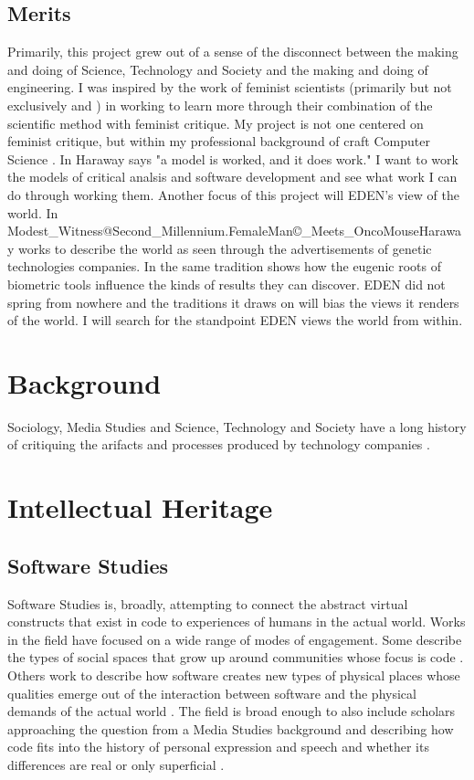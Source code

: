 \documentclass[a4paper,man,natbib]{apa6}
\begin{document}
   \subsection*{Merits}
   Primarily, this project grew out of a sense of the disconnect between the making and doing of Science, Technology and Society and the making and doing of engineering. I was inspired by the work of feminist scientists (primarily but not exclusively \citet{Roy2018-ma} and \citet{Subramaniam2014-wg}) in working to learn more through their combination of the scientific method with feminist critique. My project is not one centered on feminist critique, but within my professional background of craft Computer Science \citep[see][]{Ensmenger2012-kz}. In \citet[p. 63]{Haraway2016-nc} Haraway says "a model is worked, and it does work." I want to work the models of critical analsis and software development and see what work I can do through working them.
   Another focus of this project will EDEN's view of the world. In Modest\_Witness@Second\_Millennium.FemaleMan\copyright\_Meets\_OncoMouse\texttrademark Haraway works to describe the world as seen through the advertisements of genetic technologies companies. In the same tradition \citet{Subramaniam2014-wg} shows how the eugenic roots of biometric tools influence the kinds of results they can discover. EDEN did not spring from nowhere and the traditions it draws on will bias the views it renders of the world. I will search for the standpoint \citet{Haraway1993-kw} EDEN views the world from within.
   \section*{Background}
   Sociology, Media Studies and Science, Technology and Society have a long history of critiquing the arifacts and processes produced by technology companies \citep{Cheney-Lippold2018-lw,Dean2010-lk,Harraway1997-va}.  
   \section*{Intellectual Heritage}
   \subsection*{Software Studies}
   Software Studies is, broadly, attempting to connect the abstract virtual constructs that exist in code to experiences of humans in the actual world. Works in the field have focused on a wide range of modes of engagement. Some describe the types of social spaces that grow up around communities whose focus is code \citep{Kelty2008-jm}. Others work to describe how software creates new types of physical places whose qualities emerge out of the interaction between software and the physical demands of the actual world \citep{Bridle2018-nd,Kitchin2011-af}. The field is broad enough to also include scholars approaching the question from a Media Studies background and describing how code fits into the history of personal expression and speech and whether its differences are real or only superficial \citep{Cox2013-zo}.
\end{document}

